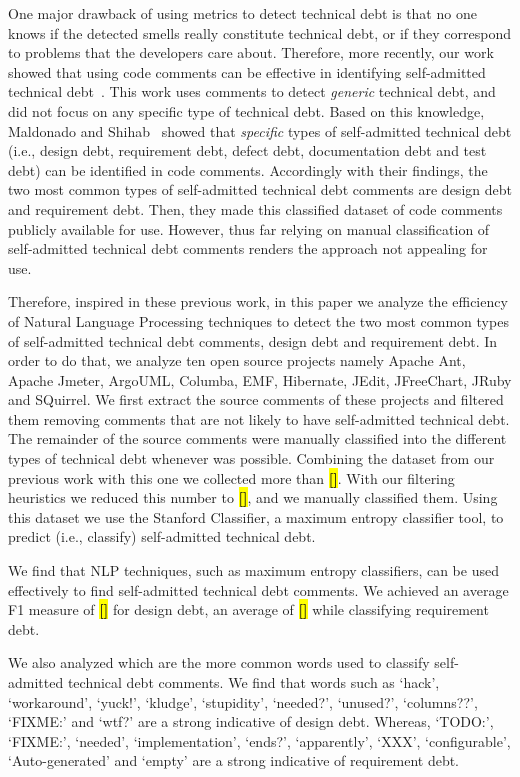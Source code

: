 \documentclass{sig-alternate}
\newcommand{\todo}[1]{\colorbox{yellow}{\textbf{[#1]}}}
\newcommand{\SATD}{self-admitted technical debt\xspace}
\begin{document}
One major drawback of using metrics to detect technical debt is that no one knows if the detected smells really constitute technical debt, or if they correspond to problems that the developers care about. Therefore, more recently, our work showed that using code comments can be effective in identifying self-admitted technical debt~\cite{Potdar2014ICSME}. This work uses comments to detect \emph{generic} technical debt, and did not focus on any specific type of technical debt. Based on this knowledge, Maldonado and Shihab~\cite{Maldonado2015MTD} showed that \emph{specific} types of self-admitted technical debt (i.e., design debt, requirement debt, defect debt, documentation debt and test debt) can be identified in code comments. Accordingly with their findings, the two most common types of \SATD comments are design debt and requirement debt. Then, they made this classified dataset of code comments publicly available for use. However, thus far relying on manual classification of \SATD comments renders the approach not appealing for use.

Therefore, inspired in these previous work, in this paper we analyze the efficiency of Natural Language Processing techniques to detect the two most common types of \SATD comments, design debt and requirement debt. In order to do that, we analyze ten open source projects namely Apache Ant, Apache Jmeter, ArgoUML, Columba, EMF, Hibernate, JEdit, JFreeChart, JRuby and SQuirrel. We first extract the source comments of these projects and filtered them removing comments that are not likely to have \SATD. The remainder of the source comments were manually classified into the different types of technical debt whenever was possible. Combining the dataset from our previous work with this one we collected more than \todo{}. With our filtering heuristics we reduced this number to \todo{}, and we manually classified them. Using this dataset we use the Stanford Classifier, a maximum entropy classifier tool, to predict (i.e., classify) \SATD.

We find that NLP techniques, such as maximum entropy classifiers, can be used effectively to find \SATD comments. We achieved an average F1 measure of \todo{} for design debt, an average of \todo{} while classifying requirement debt. 

We also analyzed which are the more common words used to classify \SATD comments. We find that words such as `hack', `workaround', `yuck!', `kludge', `stupidity', `needed?', `unused?', `columns??', `FIXME:' and `wtf?' are a strong indicative of design debt. Whereas, `TODO:', `FIXME:', `needed', `implementation', `ends?', `apparently', `XXX', `configurable', `Auto-generated' and `empty' are a strong indicative of requirement debt.
\end{document}
